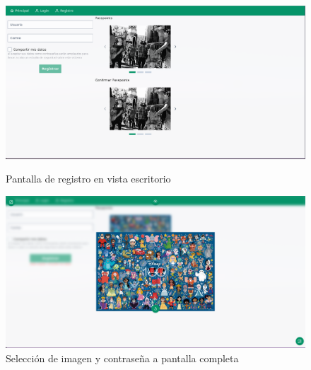 \begin{anexos}
\begin{figure}
	\begin{minipage}[ht]{\linewidth}
			\centering
		\begin{minipage}[t]{0.48\linewidth}  %
			\centering
			\includegraphics[width=\linewidth]{Graphics/capturas/registro-landscape.png}
			\caption{Pantalla de registro en vista escritorio }
			\label{register-screen}
		\end{minipage}%
		\hfill
		\begin{minipage}[t]{0.48\linewidth} %
			\centering
			\includegraphics[width=\linewidth]{Graphics/capturas/fullscreen-password-selector.png}
			\caption{Selecci\'on de imagen y contrase\~na a pantalla completa }   
			\label{full-screen-password}       
		\end{minipage}
	\end{minipage}
		

	


\end{figure}
\end{anexos}
